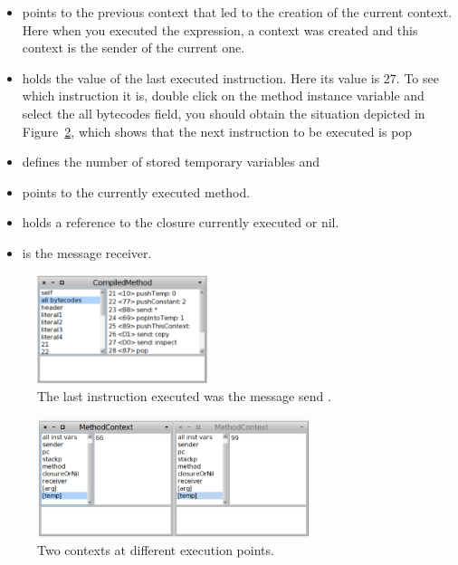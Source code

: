 \documentclass[a4paper,10pt,twoside]{book}
\begin{document}
\begin{itemize}
\item {} points to the previous context that led to the creation of the current context. Here when you executed the expression, a context was created and this context is the sender of the current one.

\item {} holds the value of the last executed instruction. Here its value is 27. To see which instruction it is, double click on the method instance variable and select the all bytecodes field, you should obtain the situation depicted in Figure~\ref{ByteCodes}, which shows that the next instruction to be executed is pop 

\item {} defines the number of stored temporary variables and

\item {} points to the currently executed method.

\item {} holds a reference to the closure currently executed or nil.

\item {} is the message receiver.
\end{itemize}


\begin{figure}[!h]
\begin{center}\includegraphics[width=5cm]{ByteCodes}
\caption{The last instruction executed was the message send .\label{ByteCodes}}
\end{center}
\end{figure}




\begin{figure}[!h]
\begin{center}\includegraphics[width=8cm]{TwoContexts}
\caption{Two contexts at different execution points.\label{ByteCodes}}
\end{center}
\end{figure}
\end{document}
